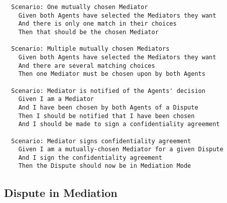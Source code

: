 \begin{lstlisting}
  Scenario: One mutually chosen Mediator
    Given both Agents have selected the Mediators they want
    And there is only one match in their choices
    Then that should be the chosen Mediator

  Scenario: Multiple mutually chosen Mediators
    Given both Agents have selected the Mediators they want
    And there are several matching choices
    Then one Mediator must be chosen upon by both Agents

  Scenario: Mediator is notified of the Agents' decision
    Given I am a Mediator
    And I have been chosen by both Agents of a Dispute
    Then I should be notified that I have been chosen
    And I should be made to sign a confidentiality agreement

  Scenario: Mediator signs confidentiality agreement
    Given I am a mutually-chosen Mediator for a given Dispute
    And I sign the confidentiality agreement
    Then the Dispute should now be in Mediation Mode
\end{lstlisting}

\subsection{Dispute in Mediation}

